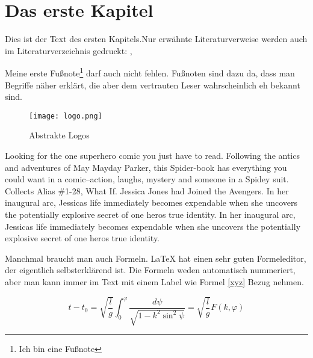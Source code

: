 
\chapter{Das erste Kapitel}
Dies ist der Text des ersten Kapitels.Nur erwähnte Literaturverweise werden auch im Literaturverzeichnis gedruckt: \cite[S.12 ff]{baumgartner:2002}, \cite[S.1-3]{dreyfus:1980}

Meine erste Fußnote\footnote{Ich bin eine Fußnote} darf auch nicht fehlen. Fußnoten sind dazu da, dass man Begriffe näher erklärt, die aber dem vertrauten Leser wahrscheinlich eh bekannt sind. 

\begin{figure}[h]
\centering
\texttt{[image: logo.png]}
\caption{Abstrakte Logos\footnotemark}
\end{figure}



Looking for the one superhero comic you just have to read. Following the antics and adventures of May Mayday Parker, this Spider-book has everything you could want in a comic--action, laughs, mystery and someone in a Spidey suit. Collects Alias \#1-28, What If. Jessica Jones had Joined the Avengers. In her inaugural arc, Jessicas life immediately becomes expendable when she uncovers the potentially explosive secret of one heros true identity. In her inaugural arc, Jessicas life immediately becomes expendable when she uncovers the potentially explosive secret of one heros true identity.

Manchmal braucht man auch Formeln. LaTeX hat einen sehr guten Formeleditor, der eigentlich selbsterklärend ist. Die Formeln weden automatisch nummeriert, aber man kann immer im Text mit einem Label wie Formel \ref{xyz} Bezug nehmen.

\begin{equation}
t-t_{0}=\sqrt{\frac{l}{g}}\int_{0}^{\varphi}{\frac{d\psi}{\sqrt{1-k^{2}\sin^{2} {\psi}}}} = \sqrt{\frac{l}{g}} F(k,\varphi)
\label{xyz}
\end{equation}

